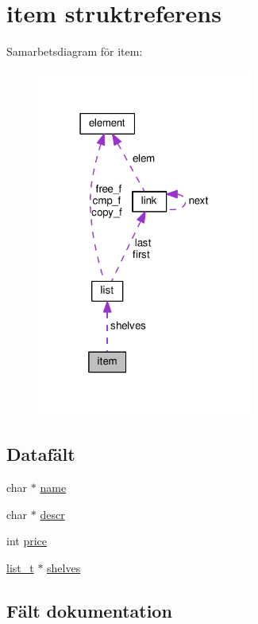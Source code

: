 \hypertarget{structitem}{}\section{item struktreferens}
\label{structitem}


Samarbetsdiagram för item\+:\nopagebreak
\begin{figure}[H]
\begin{center}
\leavevmode
\includegraphics[width=202pt]{structitem__coll__graph}
\end{center}
\end{figure}
\subsection*{Datafält}
\begin{DoxyCompactItemize}
\item 
char $\ast$ \hyperlink{structitem_adbf6cb817816601a08c614bb77bcf075}{name}
\item 
char $\ast$ \hyperlink{structitem_a7486c43d6e783fd7093dc9cee62b518f}{descr}
\item 
int \hyperlink{structitem_a77214da8535815143a7ba318a25c5811}{price}
\item 
\hyperlink{list_8h_a15376354e4e8b4f1732e9df17f30786c}{list\+\_\+t} $\ast$ \hyperlink{structitem_a2c6c18e4202d967e7ff0f4421b72bcdf}{shelves}
\end{DoxyCompactItemize}


\subsection{Fält dokumentation}
